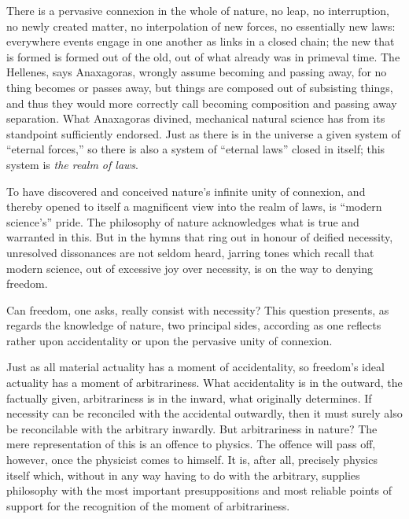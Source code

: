 \documentclass[12pt,a4paper]{book}
\begin{document}
There is a pervasive connexion in the whole of nature, no leap, no interruption, no newly
created matter, no interpolation of new forces, no essentially new laws: everywhere
events engage in one another as links in a closed chain; the new that is formed is formed
out of the old, out of what already was in primeval time. The Hellenes, says Anaxagoras,
wrongly assume becoming and passing away, for no thing becomes or passes away, but things
are composed out of subsisting things, and thus they would more correctly call becoming
composition and passing away separation. What Anaxagoras divined, mechanical natural
science has from its standpoint sufficiently endorsed. Just as there is in the universe a
given system of ``eternal forces,'' so there is also a system of ``eternal laws'' closed
in itself; this system is \emph{the realm of laws}.

To have discovered and conceived nature's infinite unity of connexion, and thereby opened
to itself a magnificent view into
the realm of laws, is ``modern science's'' pride. The philosophy of nature acknowledges
what is true and warranted in this. But in the hymns that ring out in honour of deified
necessity, unresolved dissonances are not seldom heard, jarring tones which recall that
modern science, out of excessive joy over necessity, is on the way to denying freedom.

Can freedom, one asks, really consist with necessity? This question presents, as regards
the knowledge of nature, two principal sides, according as one reflects rather upon
accidentality or upon the pervasive unity of connexion.

Just as all material actuality has a moment of accidentality, so freedom's ideal
actuality has a moment of arbitrariness. What accidentality is in the outward, the
factually given, arbitrariness is in the inward, what originally determines. If necessity
can be reconciled with the accidental outwardly, then it must surely also be reconcilable
with the arbitrary inwardly. But arbitrariness in nature? The mere representation of this
is an offence to physics. The offence will pass off, however, once the physicist comes to
himself. It is, after all, precisely physics itself which, without in any way having to
do with the arbitrary, supplies philosophy with the most important presuppositions and
most reliable points of support for the recognition of the moment of arbitrariness.
\end{document}
